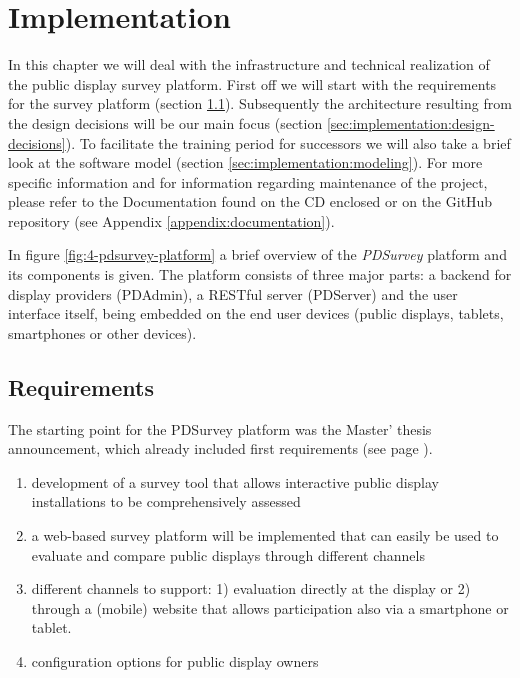\section{Implementation}
\label{sec:implementation}

	In this chapter we will deal with the infrastructure and technical realization of the public display survey platform. First off we will start with the requirements for the survey platform (section \ref{sec:implementation:requirements}). Subsequently the architecture resulting from the design decisions will be our main focus (section \ref{sec:implementation:design-decisions}). To facilitate the training period for successors we will also take a brief look at the software model (section \ref{sec:implementation:modeling}). For more specific information and for information regarding maintenance of the project, please refer to the Documentation found on the CD enclosed or on the GitHub repository (see Appendix \ref{appendix:documentation}).

	In figure \ref{fig:4-pdsurvey-platform} a brief overview of the \textit{PDSurvey} platform and its components is given. The platform consists of three major parts: a backend for display providers (PDAdmin), a RESTful server (PDServer) and the user interface itself, being embedded on the end user devices (public displays, tablets, smartphones or other devices). 






\subsection{Requirements}
\label{sec:implementation:requirements}

	The starting point for the PDSurvey platform was the Master' thesis announcement, which already included first requirements (see page \pageref{aufgabenstellung}). 

	\begin{enumerate}[itemsep=0pt] 
	\item development of a survey tool that allows interactive public display installations to be comprehensively assessed 
	\item a web-based survey platform will be implemented that can easily be used to evaluate and compare public displays through different channels 
	\item different channels to support: 1) evaluation directly at
	the display or 2) through a (mobile) website that allows participation also via a smartphone
	or tablet.
	\item configuration options for public display owners
	\end{enumerate}

